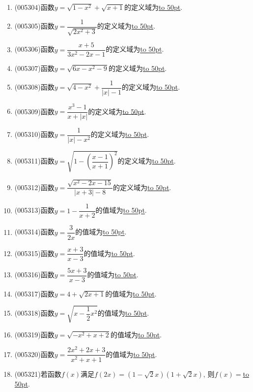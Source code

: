 \documentclass[10pt,a4paper]{article}
\newcommand{\blank}[1]{\underline{\hbox to #1pt{}}}
\begin{document}
\begin{enumerate}[1.]
{}{}
\item {\tiny (005304)}函数$y=\sqrt {1-x^2}+\sqrt {x+1}$的定义域为\blank{50}.
\item {\tiny (005305)}函数$y=\dfrac 1{\sqrt {2x^2+3}}$的定义域为\blank{50}.
\item {\tiny (005306)}函数$y=\dfrac{x+5}{3x^2-2x-1}$的定义域为\blank{50}.
\item {\tiny (005307)}函数$y=\sqrt {6x-x^2-9}$的定义域为\blank{50}.
\item {\tiny (005308)}函数$y=\sqrt {4-x^2}+\dfrac 1{|x|-1}$的定义域为\blank{50}.
\item {\tiny (005309)}函数$y=\dfrac{x^3-1}{x+|x|}$的定义域为\blank{50}.
\item {\tiny (005310)}函数$y=\dfrac 1{|x|-x^2}$的定义域为\blank{50}.
\item {\tiny (005311)}函数$y=\sqrt {1-(\dfrac{x-1}{x+1})^2}$的定义域为\blank{50}.
\item {\tiny (005312)}函数$y=\dfrac{\sqrt {x^2-2x-15}}{|x+3|-8}$的定义域为\blank{50}.
\item {\tiny (005313)}函数$y=1-\dfrac 1{x+2}$的值域为\blank{50}.
\item {\tiny (005314)}函数$y=\dfrac 3{2x}$的值域为\blank{50}.
\item {\tiny (005315)}函数$y=\dfrac{x+3}{x-3}$的值域为\blank{50}.
\item {\tiny (005316)}函数$y=\dfrac{5x+3}{x-3}$的值域为\blank{50}.
\item {\tiny (005317)}函数$y=4+\sqrt {2x+1}$的值域为\blank{50}.
\item {\tiny (005318)}函数$y=\sqrt {x-\dfrac 12x^2}$的值域为\blank{50}.
\item {\tiny (005319)}函数$y=\sqrt {-x^2+x+2}$的值域为\blank{50}.
\item {\tiny (005320)}函数$y=\dfrac{2x^2+2x+3}{x^2+x+1}$的值域为\blank{50}.
\item {\tiny (005321)}若函数$f(x)$满足$f(2x)=(1-\sqrt 2x)(1+\sqrt 2x)$, 则$f(x)=$\blank{50}.

\end{enumerate}
\end{document}
